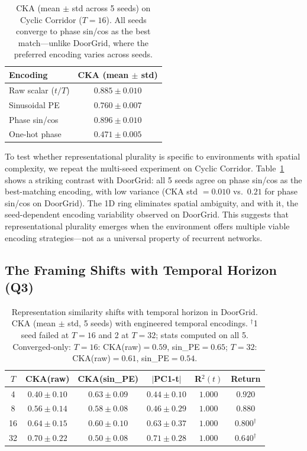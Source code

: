 \documentclass{article}
\begin{document}
\begin{table}[t]
\centering
\caption{CKA (mean $\pm$ std across 5 seeds) on Cyclic Corridor ($T = 16$).
All seeds converge to phase sin/cos as the best match---unlike DoorGrid, where the preferred encoding varies across seeds.}
\label{tab:cyclic}
\begin{tabular}{lc}
\toprule
\textbf{Encoding} & \textbf{CKA (mean $\pm$ std)} \\
\midrule
Raw scalar ($t/T$)            & $0.885 \pm 0.010$ \\
Sinusoidal PE                 & $0.760 \pm 0.007$ \\
Phase sin/cos                 & $\mathbf{0.896 \pm 0.010}$ \\
One-hot phase                 & $0.471 \pm 0.005$ \\
\bottomrule
\end{tabular}
\end{table}

To test whether representational plurality is specific to environments with spatial complexity, we repeat the multi-seed experiment on Cyclic Corridor.
Table~\ref{tab:cyclic} shows a striking contrast with DoorGrid: all 5 seeds agree on phase sin/cos as the best-matching encoding, with low variance (CKA std $= 0.010$ vs.\ $0.21$ for phase sin/cos on DoorGrid).
The 1D ring eliminates spatial ambiguity, and with it, the seed-dependent encoding variability observed on DoorGrid.
This suggests that representational plurality emerges when the environment offers multiple viable encoding strategies---not as a universal property of recurrent networks.

\subsection{The Framing Shifts with Temporal Horizon (Q3)}
\label{sec:horizon}

\begin{table}[t]
\centering
\caption{Representation similarity shifts with temporal horizon in DoorGrid.
CKA (mean $\pm$ std, 5 seeds) with engineered temporal encodings.
$^\dagger$1 seed failed at $T = 16$ and 2 at $T = 32$; stats computed on all 5.
Converged-only: $T\!=\!16$: CKA(raw)$\!=\!0.59$, sin\_PE$\!=\!0.65$; $T\!=\!32$: CKA(raw)$\!=\!0.61$, sin\_PE$\!=\!0.54$.}
\label{tab:scaling}
\begin{tabular}{cccccc}
\toprule
$T$ & \textbf{CKA(raw)} & \textbf{CKA(sin\_PE)} & \textbf{$|$PC1-t$|$} & \textbf{R$^2(t)$} & \textbf{Return} \\
\midrule
4  & $0.40 \pm 0.10$ & $\mathbf{0.63 \pm 0.09}$ & $0.44 \pm 0.10$ & $1.000$ & $0.920$ \\
8  & $0.56 \pm 0.14$ & $\mathbf{0.58 \pm 0.08}$ & $0.46 \pm 0.29$ & $1.000$ & $0.880$ \\
16 & $\mathbf{0.64 \pm 0.15}$ & $0.60 \pm 0.10$ & $0.63 \pm 0.37$ & $1.000$ & $0.800^\dagger$ \\
32 & $\mathbf{0.70 \pm 0.22}$ & $0.50 \pm 0.08$ & $0.71 \pm 0.28$ & $1.000$ & $0.640^\dagger$ \\
\bottomrule
\end{tabular}
\end{table}
\end{document}
